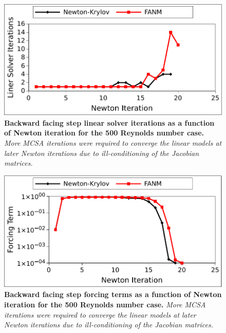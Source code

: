 \begin{figure}[t!]
  \begin{center}
    \includegraphics[width=6in]{chapters/nonlinear_problem/step_re500_iters.pdf}
  \end{center}
  \caption{\textbf{Backward facing step linear solver iterations as a
      function of Newton iteration for the 500 Reynolds number case.}
    \textit{More MCSA iterations were required to converge the linear
      models at later Newton iterations due to ill-conditioning of the
      Jacobian matrices.}}
  \label{fig:step_re500_iters}
\end{figure}

\begin{figure}[t!]
  \begin{center}
    \includegraphics[width=6in]{chapters/nonlinear_problem/step_re500_forcing.pdf}
  \end{center}
  \caption{\textbf{Backward facing step forcing terms as a function of
      Newton iteration for the 500 Reynolds number case.} \textit{More
      MCSA iterations were required to converge the linear models at
      later Newton iterations due to ill-conditioning of the Jacobian
      matrices.}}
  \label{fig:step_re500_forcing}
\end{figure}

